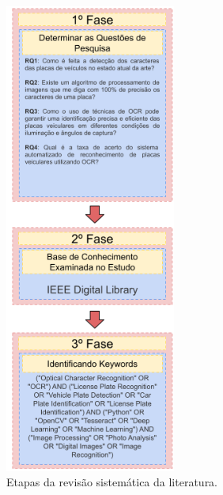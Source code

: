 \documentclass[conference]{IEEEtran}
\begin{document}
\begin{figure}[htbp]
	\centerline{\includegraphics[width=0.5\textwidth]{img1.png}}
	\caption{Etapas da revisão sistemática da literatura.}
	\label{img1}
\end{figure}
\end{document}
